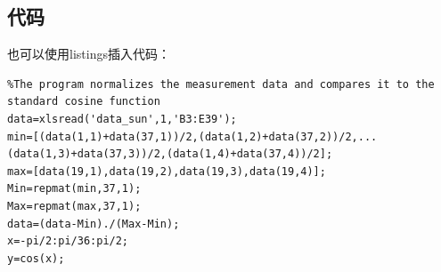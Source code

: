 \documentclass[a4paper,12pt]{report}
\begin{document}

\lstset{breaklines}                %
\lstset{extendedchars=false}
\lstset{language=Matlab}
\renewcommand{\thechapter}{附录\Alph{chapter}.} 
\appendix
\begin{appendix}
    
    
\chapter{代码}
\songti
\begin{spacing}{1.5}
    也可以使用listings插入代码：
\begin{lstlisting}
%The program normalizes the measurement data and compares it to the standard cosine function
data=xlsread('data_sun',1,'B3:E39');
min=[(data(1,1)+data(37,1))/2,(data(1,2)+data(37,2))/2,...
(data(1,3)+data(37,3))/2,(data(1,4)+data(37,4))/2];
max=[data(19,1),data(19,2),data(19,3),data(19,4)];
Min=repmat(min,37,1);
Max=repmat(max,37,1);
data=(data-Min)./(Max-Min);
x=-pi/2:pi/36:pi/2;
y=cos(x);
\end{lstlisting}

\end{spacing}


\end{appendix}
        
\end{document}
